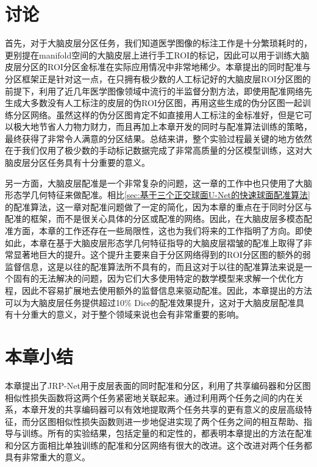 \section{讨论}
首先，对于大脑皮层分区任务，我们知道医学图像的标注工作是十分繁琐耗时的，更别提在manifold空间的大脑皮层上进行手工ROI的标记，因此可以用于训练大脑皮层分区的ROI分区金标准在实际应用情况中非常地稀少。本章提出的同时配准与分区框架正是针对这一点，在只拥有极少数的人工标记好的大脑皮层ROI分区图的前提下，利用了近几年医学图像领域中流行的半监督分割方法，即使用配准网络先生成大多数没有人工标注的皮层的伪ROI分区图，再用这些生成的伪分区图一起训练分区网络。虽然这样的伪分区图肯定不如直接用人工标注的金标准好，但是它可以极大地节省人力物力财力，而且再加上本章开发的同时与配准算法训练的策略，最终获得了非常令人满意的分区结果。总结来讲，整个实验过程最关键的地方依然在于我们仅用了极少数的手动标记数据完成了非常高质量的分区模型训练，这对大脑皮层分区任务具有十分重要的意义。

另一方面，大脑皮层配准是一个非常复杂的问题，这一章的工作中也只使用了大脑形态学几何特征来做配准。相比\ref{sec:基于三个正交球面U-Net的快速球面配准算法}的配准算法，这一章对配准问题做了一定的简化，因为本章的重点在于同时分区与配准的框架，而不是很关心具体的分区或配准的网络。因此，在大脑皮层多模态配准方面，本章的工作还存在一些局限性，这也为我们将来的工作指明了方向。即使如此，本章在基于大脑皮层形态学几何特征指导的大脑皮层褶皱的配准上取得了非常显著地巨大的提升。这个提升主要来自于分区网络得到的ROI分区图的额外的弱监督信息，这是以往的配准算法所不具有的，而且这对于以往的配准算法来说是一个固有的无法解决的问题，因为它们大多使用特定的数学模型来求解一个优化方程，因此不容易扩展地去使用额外的监督信息来驱动配准。因此，本章提出的方法可以为大脑皮层任务提供超过10\% Dice的配准效果提升，这对于大脑皮层配准具有十分重大的意义，对于整个领域来说也会有非常重要的影响。

\section{本章小结}
本章提出了JRP-Net用于皮层表面的同时配准和分区，利用了共享编码器和分区图相似性损失函数将这两个任务紧密地关联起来。通过利用两个任务之间的内在关系，本章开发的共享编码器可以有效地提取两个任务共享的更有意义的皮层高级特征，而分区图相似性损失函数则进一步地促进实现了两个任务之间的相互帮助、指导与训练。所有的实验结果，包括定量的和定性的，都表明本章提出的方法在配准和分区方面相比单独训练的配准和分区网络有很大的改进。这个改进对两个任务都具有非常重大的意义。





